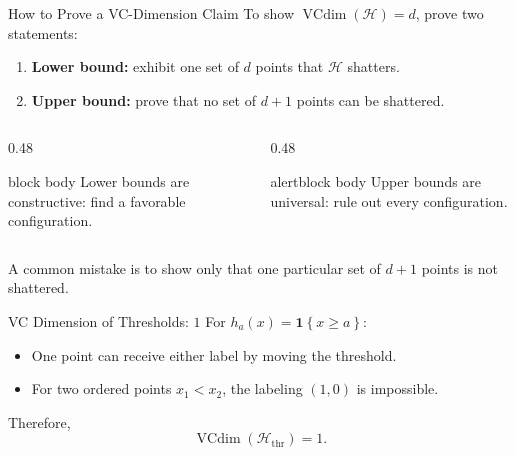 \documentclass[aspectratio=169,10pt]{beamer}
\newcommand{\Hc}{\mathcal{H}}
\newcommand{\vcdim}{\operatorname{VCdim}}
\newcommand{\ind}[1]{\mathbf{1}\!\left\{#1\right\}}
\newcommand{\KeyBox}[1]{%
  \begin{beamercolorbox}[rounded=true,sep=0.22cm,wd=\linewidth]{block body}
    #1
  \end{beamercolorbox}%
}
\newcommand{\OrangeBox}[1]{%
  \begin{beamercolorbox}[rounded=true,sep=0.22cm,wd=\linewidth]{alertblock body}
    #1
  \end{beamercolorbox}%
}
\begin{document}
\begin{frame}[t]{How to Prove a VC-Dimension Claim}
  \vspace{0.05cm}
  To show $\vcdim(\Hc)=d$, prove two statements:
  \vspace{0.05cm}
  \begin{enumerate}
    \setlength{\itemsep}{0.18cm}
    \item \textbf{Lower bound:} exhibit one set of $d$ points that $\Hc$ shatters.
    \item \textbf{Upper bound:} prove that no set of $d+1$ points can be shattered.
  \end{enumerate}
  \vspace{0.10cm}
  \begin{columns}[T,totalwidth=\textwidth]
    \begin{column}{0.48\textwidth}
      \KeyBox{Lower bounds are constructive: find a favorable configuration.}
    \end{column}
    \begin{column}{0.48\textwidth}
      \OrangeBox{Upper bounds are universal: rule out every configuration.}
    \end{column}
  \end{columns}
  \vspace{0.12cm}
  A common mistake is to show only that one particular set of $d+1$ points is not shattered.
\end{frame}

\begin{frame}[t]{VC Dimension of Thresholds: $1$}
  \vspace{0.05cm}
  For $h_a(x)=\ind{x\ge a}$:
  \begin{itemize}
    \setlength{\itemsep}{0.14cm}
    \item One point can receive either label by moving the threshold.
    \item For two ordered points $x_1<x_2$, the labeling $(1,0)$ is impossible.
  \end{itemize}
  Therefore,
  \[
    \boxed{\vcdim(\Hc_{\mathrm{thr}})=1.}
  \]
  \begin{center}
  \end{center}
\end{frame}
\end{document}

